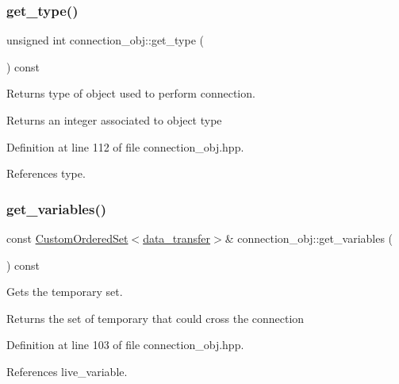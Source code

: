 \subsubsection{\texorpdfstring{get\+\_\+type()}{get\_type()}}
{\footnotesize\ttfamily unsigned int connection\+\_\+obj\+::get\+\_\+type (\begin{DoxyParamCaption}{ }\end{DoxyParamCaption}) const\hspace{0.3cm}{\ttfamily [inline]}}



Returns type of object used to perform connection. 

\begin{DoxyReturn}{Returns}
an integer associated to object type 
\end{DoxyReturn}


Definition at line 112 of file connection\+\_\+obj.\+hpp.



References type.

\mbox{\label{classconnection__obj_a0fb7f6642b13fe69f3036aaf8781f22b}} 
\subsubsection{\texorpdfstring{get\+\_\+variables()}{get\_variables()}}
{\footnotesize\ttfamily const \hyperlink{classCustomOrderedSet}{Custom\+Ordered\+Set}$<$\hyperlink{conn__binding_8hpp_ae44ffa64566f2bb3ce6941833ac940fb}{data\+\_\+transfer}$>$\& connection\+\_\+obj\+::get\+\_\+variables (\begin{DoxyParamCaption}{ }\end{DoxyParamCaption}) const\hspace{0.3cm}{\ttfamily [inline]}}



Gets the temporary set. 

\begin{DoxyReturn}{Returns}
the set of temporary that could cross the connection 
\end{DoxyReturn}


Definition at line 103 of file connection\+\_\+obj.\+hpp.



References live\+\_\+variable.




